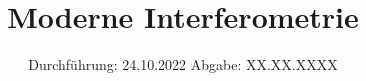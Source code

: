 

\subject{V64}
\title{Moderne Interferometrie}
\date{%
  Durchführung: 24.10.2022
  \hspace{3em}
  Abgabe: XX.XX.XXXX
}



\maketitle
\thispagestyle{empty}
\tableofcontents
\newpage






\printbibliography{}


